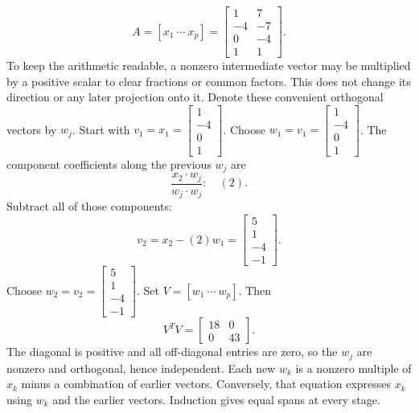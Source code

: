 \[A=[x_1\ \cdots\ x_p]=\left[\begin{array}{rr}1&7\\-4&-7\\0&-4\\1&1\end{array}\right].\]
To keep the arithmetic readable, a nonzero intermediate vector may be multiplied by a positive scalar to clear fractions or common factors. This does not change its direction or any later projection onto it. Denote these convenient orthogonal vectors by $w_j$.
Start with $v_1=x_1=\left[\begin{array}{r}1\\-4\\0\\1\end{array}\right]$.
Choose $w_{1}=v_{1}=\left[\begin{array}{r}1\\-4\\0\\1\end{array}\right]$.
The component coefficients along the previous $w_j$ are
\[\frac{x_{2}\cdot w_j}{w_j\cdot w_j}:\quad(2).\]
Subtract all of those components:
\[v_{2}=x_{2}-(2)w_{1}=\left[\begin{array}{r}5\\1\\-4\\-1\end{array}\right].\]
Choose $w_{2}=v_{2}=\left[\begin{array}{r}5\\1\\-4\\-1\end{array}\right]$.
Set $V=[w_1\ \cdots\ w_p]$. Then
\[V^TV=\left[\begin{array}{rr}18&0\\0&43\end{array}\right].\]
The diagonal is positive and all off-diagonal entries are zero, so the $w_j$ are nonzero and orthogonal, hence independent. Each new $w_k$ is a nonzero multiple of $x_k$ minus a combination of earlier vectors. Conversely, that equation expresses $x_k$ using $w_k$ and the earlier vectors. Induction gives equal spans at every stage.

